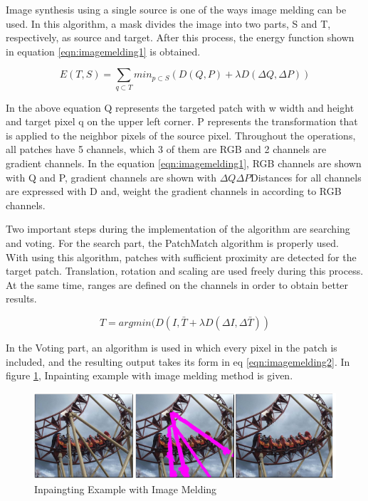 Image synthesis using a single source is one of the ways image melding can be used. In this algorithm, a mask divides the image into two parts, S and T, respectively, as source and target. After this process, the energy function shown in equation \ref{eqn:imagemelding1} is obtained.

\begin{equation}
    \label{eqn:imagemelding1}
    E(T,S) = \sum\limits_{q\subset T}{min_{p\subset S}(D(Q,P)+\lambda D(\Delta Q, \Delta P))}
\end{equation}

In the above equation Q represents the targeted patch with w width and height and target pixel q on the upper left corner. P represents the transformation that is applied to the neighbor pixels of the source pixel. Throughout the operations, all patches have 5 channels, which 3 of them are RGB and 2 channels are gradient channels. In the equation \ref{eqn:imagemelding1}, RGB channels are shown with Q and P, gradient channels are shown with \(\Delta Q \Delta P \)Distances for all channels are expressed with D and,  weight the gradient channels in according to RGB channels.

Two important steps during the implementation of the algorithm are searching and voting. For the search part, the PatchMatch algorithm is properly used. With using this algorithm, patches with sufficient proximity are detected for the target patch. Translation, rotation and scaling are used freely during this process. At the same time, ranges are defined on the channels in order to obtain better results.

\begin{equation}
    \label{eqn:imagemelding2}
    T= argmin(D(I,\bar{T}+\lambda D(\Delta I,\Delta \bar{T}))
\end{equation}

In the Voting part, an algorithm is used in which every pixel in the patch is included, and the resulting output takes its form in eq \ref{eqn:imagemelding2}. In figure \ref{fig:inpainting-image-melding}, Inpainting example with image melding method is given.

\begin{figure}[h]
    \centering
    \includegraphics{figures/chapter2/ImageMeldingExample.png}
    \vspace*{5mm}
    \caption{Inpaingting Example with Image Melding\cite{imagemelding}}
    \label{fig:inpainting-image-melding}
\end{figure}


